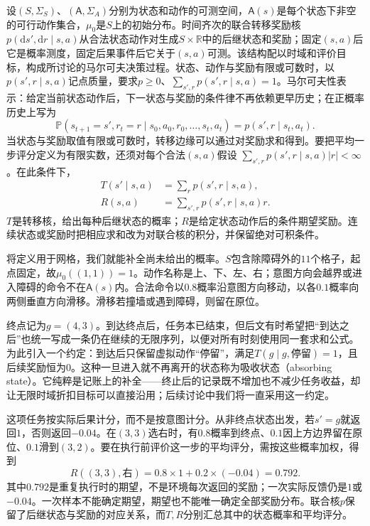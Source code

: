 \begin{definition}[马尔可夫决策过程]
  \label{def:rl-overview-mdp}
  设$(S,\Sigma_S)$、$(\mathsf A,\Sigma_A)$分别为状态和动作的可测空间，$\mathsf A(s)$是每个状态下非空的可行动作集合，$\mu_0$是$S$上的初始分布。时间齐次的联合转移奖励核$p(\mathrm ds',\mathrm dr\mid s,a)$从合法状态动作对生成$S\times\mathbb R$中的后继状态和奖励；固定$(s,a)$后它是概率测度，固定后果事件后它关于$(s,a)$可测。该结构配以时域和评价目标，构成所讨论的马尔可夫决策过程。状态、动作与奖励有限或可数时，以$p(s',r\mid s,a)$记点质量，要求$p\geq0$、$\sum_{s',r}p(s',r\mid s,a)=1$。马尔可夫性表示：给定当前状态动作后，下一状态与奖励的条件律不再依赖更早历史；在正概率历史上写为
  \begin{equation}
    \mathbb P(s_{t+1}=s',r_t=r\mid s_0,a_0,r_0,\ldots,s_t,a_t)
    =p(s',r\mid s_t,a_t).
    \label{eq:rl-overview-markov}
  \end{equation}
  当状态与奖励取值有限或可数时，转移边缘可以通过对奖励求和得到。要把平均一步评分定义为有限实数，还须对每个合法$(s,a)$假设
  $\sum_{s',r}p(s',r\mid s,a)|r|<\infty$。在此条件下，
  \begin{equation}
  \begin{aligned}
    T(s'\mid s,a)&=\sum_r p(s',r\mid s,a),\\
    R(s,a)&=\sum_{s',r}p(s',r\mid s,a)r.
  \end{aligned}
  \label{eq:rl-overview-kernels}
  \end{equation}
  $T$是转移核，给出每种后继状态的概率；$R$是给定状态动作后的条件期望奖励。连续状态或奖励时把相应求和改为对联合核的积分，并保留绝对可积条件。
\end{definition}

将定义用于网格，我们就能补全尚未给出的概率。$S$包含除障碍外的$11$个格子，起点固定，故$\mu_0((1,1))=1$。动作名称是上、下、左、右；意图方向会越界或进入障碍的命令不在$\mathsf A(s)$内。合法命令以$0.8$概率沿意图方向移动，以各$0.1$概率向两侧垂直方向滑移。滑移若撞墙或遇到障碍，则留在原位。

终点记为$g=(4,3)$。到达终点后，任务本已结束，但后文有时希望把“到达之后”也统一写成一条仍在继续的无限序列，以便对所有时刻使用同一套求和公式。为此引入一个约定：到达后只保留虚拟动作“停留”，满足$T(g\mid g,\text{停留})=1$，且后续奖励恒为$0$。这种一旦进入就不再离开的状态称为吸收状态（absorbing state）。它纯粹是记账上的补全——终止后的记录既不增加也不减少任务收益，却让无限时域折扣目标可以直接沿用；后续讨论中我们将一直采用这一约定。

这项任务按实际后果计分，而不是按意图计分。从非终点状态出发，若$s'=g$就返回$1$，否则返回$-0.04$。在$(3,3)$选右时，有$0.8$概率到终点、$0.1$因上方边界留在原位、$0.1$滑到$(3,2)$。要在执行前评价这一步的平均评分，需按这些概率加权，得到
\[
  R((3,3),\text{右})=0.8\times1+0.2\times(-0.04)=0.792.
\]
其中$0.792$是重复执行时的期望，不是环境每次返回的奖励；一次实际反馈仍是$1$或$-0.04$。一次样本不能确定期望，期望也不能唯一确定全部奖励分布。联合核$p$保留了后继状态与奖励的对应关系，而$T,R$分别汇总其中的状态概率和平均评分。

